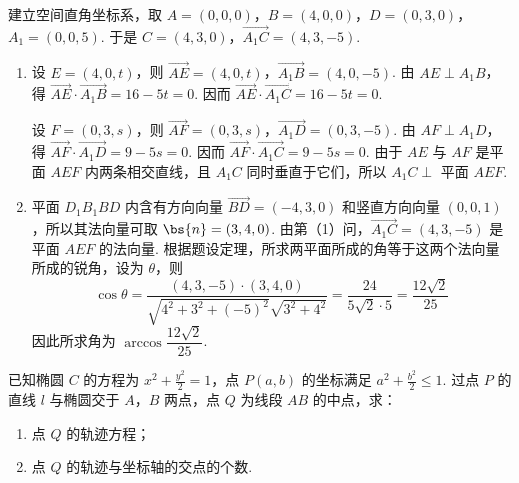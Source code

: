 \begin{solution}
建立空间直角坐标系，取 \(A=(0,0,0)\)，\(B=(4,0,0)\)，\(D=(0,3,0)\)，\(A_{1}=(0,0,5)\). 于是 \(C=(4,3,0)\)，\(\overrightarrow{A_{1}C}=(4,3,-5)\).

\begin{enumerate}
\item 设 \(E=(4,0,t)\)，则 \(\overrightarrow{AE}=(4,0,t)\)，\(\overrightarrow{A_{1}B}=(4,0,-5)\). 由 \(AE\perp A_{1}B\)，得 \(\overrightarrow{AE}\cdot\overrightarrow{A_{1}B}=16-5t=0\). 因而 \(\overrightarrow{AE}\cdot\overrightarrow{A_{1}C}=16-5t=0\).

设 \(F=(0,3,s)\)，则 \(\overrightarrow{AF}=(0,3,s)\)，\(\overrightarrow{A_{1}D}=(0,3,-5)\). 由 \(AF\perp A_{1}D\)，得 \(\overrightarrow{AF}\cdot\overrightarrow{A_{1}D}=9-5s=0\). 因而 \(\overrightarrow{AF}\cdot\overrightarrow{A_{1}C}=9-5s=0\). 由于 \(AE\) 与 \(AF\) 是平面 \(AEF\) 内两条相交直线，且 \(A_{1}C\) 同时垂直于它们，所以 \(A_{1}C\perp\) 平面 \(AEF\).

\item 平面 \(D_{1}B_{1}BD\) 内含有方向向量 \(\overrightarrow{BD}=(-4,3,0)\) 和竖直方向向量 \((0,0,1)\)，所以其法向量可取 \(\bs{n}=(3,4,0)\). 由第（1）问，\(\overrightarrow{A_{1}C}=(4,3,-5)\) 是平面 \(AEF\) 的法向量. 根据题设定理，所求两平面所成的角等于这两个法向量所成的锐角，设为 \(\theta\)，则
\[
\cos\theta=\frac{(4,3,-5)\cdot(3,4,0)}{\sqrt{4^{2}+3^{2}+(-5)^{2}}\sqrt{3^{2}+4^{2}}}=\frac{24}{5\sqrt{2}\cdot5}=\frac{12\sqrt{2}}{25}
\]
因此所求角为 \(\arccos\dfrac{12\sqrt{2}}{25}\).
\end{enumerate}
\end{solution}

\begin{problem}
已知椭圆 \(C\) 的方程为 \(x^{2}+\frac{y^{2}}{2}=1\)，点 \(P(a,b)\) 的坐标满足 \(a^{2}+\frac{b^{2}}{2}\leqslant 1\). 过点 \(P\) 的直线 \(l\) 与椭圆交于 \(A\)，\(B\) 两点，点 \(Q\) 为线段 \(AB\) 的中点，求：

\begin{enumerate}
\item 点 \(Q\) 的轨迹方程；
\item 点 \(Q\) 的轨迹与坐标轴的交点的个数.
\end{enumerate}

\end{problem}

